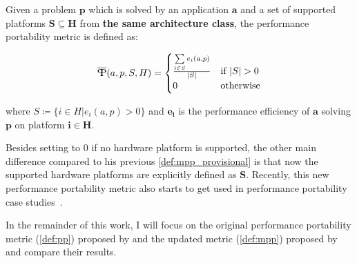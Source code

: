 \begin{definition}\label{def:mpp}
    Given a problem $\mathbf{p}$ which is solved by an application $\mathbf{a}$ and a set of supported platforms $\mathbf{S} \subseteq \mathbf{H}$ from \textbf{the same architecture class}, the performance portability metric \mpp is defined as:

    \[ \mpp(a, p, S, H) = 
        \begin{cases}
            \frac{\sum\limits_{i \in S} e_i(a, p)}{\abs{S}} & \text{if }\abs{S} > 0 \\
            0                                               & \text{otherwise}
        \end{cases} 
    \]

    where $S \coloneqq \{ i \in H | e_i(a, p) > 0 \}$ and $\mathbf{e_i}$ is the performance efficiency of $\mathbf{a}$ solving $\mathbf{p}$ on platform $\mathbf{i \in H}$.
\end{definition}
Besides setting \mpp to $0$ if no hardware platform is supported, the other main difference compared to his previous \autoref{def:mpp_provisional} is that now the supported hardware platforms are explicitly defined as $\mathbf{S}$. 
Recently, this new performance portability metric also starts to get used in performance portability case studies~\cite{costanzo_analyzing_2025, bartolomeu_effect_2025, stec_performance_2025}. 

In the remainder of this work, I will focus on the original performance portability metric \pp (\autoref{def:pp}) proposed by \citet{pennycook_metric_2016} and the updated metric \mpp (\autoref{def:mpp}) proposed by \citet{marowka_comparison_2023} and compare their results. 
